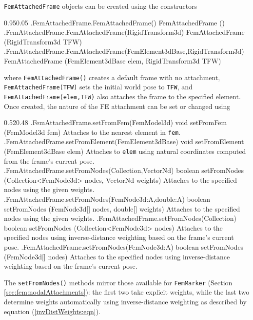 {\tt FemAttachedFrame} objects can be created using the constructors
%
\begin{methodtable}{0.95}{0.05}
\midline
%
\methodentry
{\fem.FemAttachedFrame.FemAttachedFrame()}%
{FemAttachedFrame ()}%
{\ }%
%
\methodentry
{\fem.FemAttachedFrame.FemAttachedFrame(RigidTransform3d)}%
{FemAttachedFrame (RigidTransform3d TFW)}%
{\ }%
%
\methodentry
{\fem.FemAttachedFrame.FemAttachedFrame(FemElement3dBase,RigidTransform3d)}%
{FemAttachedFrame (FemElement3dBase elem, RigidTransform3d TFW)}%
{\ }%
%
\midline
\end{methodtable}
%
where {\tt FemAttachedFrame()} creates a default frame with no attachment, {\tt
FemAttachedFrame(TFW)} sets the initial world pose to {\tt TFW}, and {\tt
FemAttachedFrame(elem,TFW)} also attaches the frame to the specified
element. Once created, the nature of the FE attachment can be set or changed
using
%
\begin{methodtable}[\smallskipamount]{0.52}{0.48}
\midline
%
\methodentry
{\fem.FemAttachedFrame.setFromFem(FemModel3d)}%
{void setFromFem (FemModel3d fem)}%
{Attaches to the nearest element in {\tt fem}.}%
%
\methodentry
{\fem.FemAttachedFrame.setFromElement(FemElement3dBase)}%
{void setFromElement (FemElement3dBase elem)}%
{Attaches to {\tt elem} using natural coordinates computed from the
frame's current pose.}%
%
\methodentry
{\fem.FemAttachedFrame.setFromNodes(Collection,VectorNd)}%
{boolean setFromNodes (\brh Collection<FemNode3d> nodes, VectorNd weights)}%
{Attaches to the specified nodes using the given weights.}%
%
\methodentry
{\fem.FemAttachedFrame.setFromNodes(FemNode3d:A,double:A)}%
{boolean setFromNodes (\brh FemNode3d[] nodes, double[] weights)}%
{Attaches to the specified nodes using the given weights.}%
%
\methodentry
{\fem.FemAttachedFrame.setFromNodes(Collection)}%
{boolean setFromNodes (Collection<FemNode3d> nodes)}%
{Attaches to the specified nodes using inverse-distance weighting based
on the frame's current pose.}%
%
\methodentry
{\fem.FemAttachedFrame.setFromNodes(FemNode3d:A)}%
{boolean setFromNodes (FemNode3d[] nodes)}%
{Attaches to the specified nodes using inverse-distance weighting based
on the frame's current pose.}%
%
\midline
\end{methodtable}
%
The {\tt setFromNodes()} methods mirror those available for {\tt FemMarker}
(Section \ref{sec:fem:nodalAttachments}): the first two take explicit weights,
while the last two determine weights automatically using inverse-distance
weighting as described by equation (\ref{invDistWeights:eqn}).

